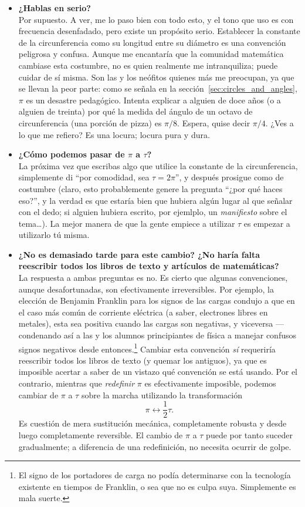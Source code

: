 \begin{itemize}

  \item \textbf{¿Hablas en serio?} \\ Por supuesto. A ver, me lo paso bien con todo esto, y el tono que uso es con frecuencia desenfadado, pero existe un propósito serio. Establecer la constante de la circunferencia como su longitud entre su diámetro es una convención peligrosa y confusa. Aunque me encantaría que la comunidad matemática cambiase esta costumbre, no es quien realmente me intranquiliza; puede cuidar de sí misma. Son las y los neófitos quienes más me preocupan, ya que se llevan la peor parte: como se señala en la sección~\ref{sec:circles_and_angles}, $\pi$ es un desastre pedagógico. Intenta explicar a alguien de doce años (o a alguien de treinta) por qué la medida del ángulo de un octavo de circunferencia (una porción de pizza) es $\pi/8$. Espera, quise decir $\pi/4$. ¿Ves a lo que me refiero? Es una locura; locura pura y dura.

  \item \textbf{¿Cómo podemos pasar de $\pi$ a $\tau$?} \\ La próxima vez que escribas algo que utilice la constante de la circunferencia, simplemente di ``por comodidad, sea $\tau = 2\pi$'', y después prosigue como de costumbre (claro, esto probablemente genere la pregunta ``¿por qué haces eso?'', y la verdad es que estaría bien que hubiera algún lugar al que señalar con el dedo; si alguien hubiera escrito, por ejemlplo, un \emph{manifiesto} sobre el tema\ldots). La mejor manera de que la gente empiece a utilizar $\tau$ es empezar a utilizarlo tú misma.

  \item \textbf{¿No es demasiado tarde para este cambio? ¿No haría falta reescribir todos los libros de texto y artículos de matemáticas?} \\ La respuesta a ambas preguntas es no. Es cierto que algunas convenciones, aunque desafortunadas, son efectivamente irreversibles. Por ejemplo, la elección de Benjamin Franklin para los signos de las cargas condujo a que en el caso más común de corriente eléctrica (a saber, electrones libres en metales), esta sea positiva cuando las cargas son negativas, y viceversa ---condenando así a las y los alumnos principiantes de física a manejar confusos signos negativos desde entonces.\footnote{El signo de los portadores de carga no podía determinarse con la tecnología existente en tiempos de Franklin, o sea que no es culpa suya. Simplemente es mala suerte.} Cambiar esta convención \emph{sí} requeriría reescribir todos los libros de texto (y quemar los antiguos), ya que es imposible acertar a saber de un vistazo qué convención se está usando. Por el contrario, mientras que \emph{redefinir} $\pi$ es efectivamente imposible, podemos cambiar de $\pi$ a $\tau$ sobre la marcha utilizando la transformación \[ \pi \leftrightarrow \textstyle{\frac{1}{2}}\tau. \] Es cuestión de mera sustitución mecánica, completamente robusta y desde luego completamente reversible. El cambio de  $\pi$ a $\tau$ puede por tanto suceder gradualmente; a diferencia de una redefinición, no necesita ocurrir de golpe.


\end{itemize}

